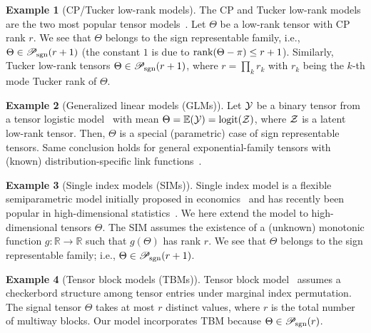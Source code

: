 \documentclass{article}
\theoremstyle{plain}
\theoremstyle{definition}
\newtheorem{example}{Example}
\def\rank{\textup{rank}}
\def\caliP{\mathscr{P}_{\textup{sgn}}}
\begin{document}
\begin{example}[CP/Tucker low-rank models] The CP and Tucker low-rank models are the two most popular tensor models~\cite{anandkumar2014tensor,montanari2018spectral,kadmon2018statistical,cai2019nonconvex}. Let $\Theta$ be a low-rank tensor with CP rank $r$. We see that $\Theta$ belongs to the sign representable family, i.e., $\Theta\in\caliP(r+1)$ (the constant $1$ is due to $\rank(\Theta-\pi)\leq r+1$). Similarly, Tucker low-rank tensors $\Theta\in\caliP(r+1)$, where $r=\prod_kr_k$ with $r_k$ being the $k$-th mode Tucker rank of $\Theta$.  
\end{example} 

\begin{example}[Generalized linear models (GLMs)] Let $\mathcal{Y}$ be a binary tensor from a tensor logistic model~\cite{wang2018learning} with mean $\Theta=\mathbb{E}(\mathcal{Y})=\text{logit}(\mathcal{Z})$, where $\mathcal{Z}$ is a latent low-rank tensor. Then, $\Theta$ is a special (parametric) case of sign representable tensors. Same conclusion holds for general exponential-family tensors with (known) distribution-specific link functions~\cite{hong2020generalized}.
\end{example}

\begin{example}[Single index models (SIMs)] Single index model is a flexible semiparametric model initially proposed in economics~\cite{robinson1988root} and has recently been popular in high-dimensional statistics~\cite{balabdaoui2019least,ganti2017learning,alquier2013sparse}. We here extend the model to high-dimensional tensors $\Theta$. The SIM assumes the existence of a (unknown) monotonic function $g\colon \mathbb{R}\to \mathbb{R}$ such that $g(\Theta)$ has rank $r$. We see that $\Theta$ belongs to the sign representable family; i.e., $\Theta\in \caliP(r+1)$. 
\end{example}

\begin{example}[Tensor block models (TBMs)] Tensor block model~\cite{wang2019multiway,chi2020provable} assumes a checkerbord structure among tensor entries under marginal index permutation. The signal tensor $\Theta$ takes at most $r$ distinct values, where $r$ is the total number of multiway blocks. Our model incorporates TBM because $\Theta \in \caliP(r)$. 
\end{example}
\end{document}
